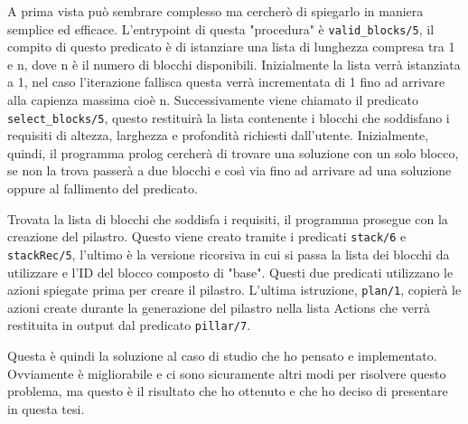 A prima vista può sembrare complesso ma cercherò di spiegarlo in maniera semplice ed efficace. L'entrypoint di questa "procedura" è \verb+valid_blocks/5+, il compito di questo predicato è di istanziare una lista di lunghezza compresa tra 1 e n, dove n è il numero di blocchi disponibili. Inizialmente la lista verrà istanziata a 1, nel caso l'iterazione fallisca questa verrà incrementata di 1 fino ad arrivare alla capienza massima cioè n.
Successivamente viene chiamato il predicato \verb+select_blocks/5+, questo restituirà la lista contenente i blocchi che soddisfano i requisiti di altezza, larghezza e profondità richiesti dall'utente. Inizialmente, quindi, il programma prolog cercherà di trovare una soluzione con un solo blocco, se non la trova passerà a due blocchi e così via fino ad arrivare ad una soluzione oppure al fallimento del predicato.

Trovata la lista di blocchi che soddisfa i requisiti, il programma prosegue con la creazione del pilastro. Questo viene creato tramite i predicati \verb+stack/6+ e \verb+stackRec/5+, l'ultimo è la versione ricorsiva in cui si passa la lista dei blocchi da utilizzare e l'ID del blocco composto di "base". Questi due predicati utilizzano le azioni spiegate prima per creare il pilastro. L'ultima istruzione, \verb+plan/1+, copierà le azioni create durante la generazione del pilastro nella lista Actions che verrà restituita in output dal predicato \verb+pillar/7+.

Questa è quindi la soluzione al caso di studio che ho pensato e implementato. Ovviamente è migliorabile e ci sono sicuramente altri modi per risolvere questo problema, ma questo è il risultato che ho ottenuto e che ho deciso di presentare in questa tesi.

